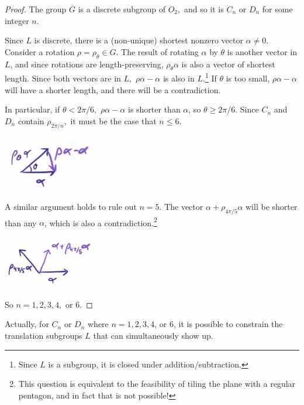 \begin{proof}
The group $\overline{G}$ is a discrete subgroup of $O_2,$ and so it is $C_n$ or $D_n$ for some integer $n.$

Since $L$ is discrete, there is a (non-unique) shortest nonzero vector $\alpha \neq 0$. Consider a rotation $\rho = \rho_\theta \in G.$ The result of rotating $\alpha$ by $\theta$ is another vector in $L$, and since rotations are length-preserving, $\rho_{\theta} \alpha$ is also a vector of shortest length. Since both vectors are in $L,$  $\rho\alpha - \alpha$ is also in $L.$\footnote{Since $L$ is a subgroup, it is closed under addition/subtraction.} If $\theta$ is too small, $\rho\alpha - \alpha$ will have a shorter length, and there will be a contradiction. 

In particular, if $\theta < 2\pi/6,$ $\rho\alpha - \alpha$ is shorter than $\alpha$, so $\theta \geq 2\pi/6.$ Since $C_n$ and $D_n$ contain $\rho_{2\pi/n},$ it must be the case that $n \leq 6.$ 
\begin{center}
    \includegraphics[width=4cm]{Lecture Files and Images/lec16-thetatriangle2.png}
\end{center}

A similar argument holds to rule out $n = 5.$ The vector $\alpha + \rho_{4\pi/5} \alpha$ will be shorter than any $\alpha$, which is also a contradiction.\footnote{This question is equivalent to the feasibility of tiling the plane with a regular pentagon, and in fact that is not possible!}%

\begin{center}
    \includegraphics[width=4cm]{Lecture Files and Images/lec16-nis52.png}
\end{center}

So $n = 1, 2, 3, 4,$ or 6.  
\end{proof}
Actually, for $C_n$ or $D_n$ where $n = 1, 2, 3, 4$, or 6, it is possible to constrain the translation subgroups $L$ that can simultaneously show up.

